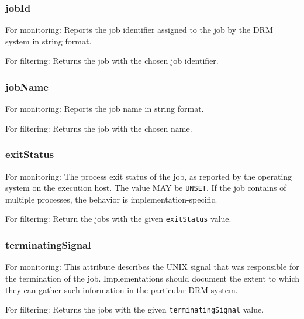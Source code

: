 \documentclass{article}
\newcommand{\h}[1]{\lstinline|#1|}
\newcommand{\rat}[1]{}
\begin{document}
\subsubsection{jobId}

For monitoring: Reports the job identifier assigned to the job by the DRM system in string format.

For filtering: Returns the job with the chosen job identifier.

\subsubsection{jobName}

For monitoring: Reports the job name in string format.

For filtering: Returns the job with the chosen name.

\subsubsection{exitStatus}

For monitoring: The process exit status of the job, as reported by the operating system on the execution host. The value MAY be \h{UNSET}. If the job contains of multiple processes, the behavior is implementation-specific.

For filtering: Return the jobs with the given \h{exitStatus} value.

\rat{Jobs without exit status information should be filtered out by asking for the appropriate states.}

\rat{June 29th 2011 conf call decided to explicitly decline any relationship between job status and exit code, since there is no common behavior in DRM systems. For this reason, exit status is allowed to be UNSET, without giving any further reasons. It is, however, expected that many implementations will put this on UNSET in the non-terminal job states.
}

\subsubsection{terminatingSignal}

For monitoring: This attribute describes the UNIX signal that was responsible for the termination of the job. Implementations should document the extent to which they can gather such information in the particular DRM system.

For filtering: Returns the jobs with the given \h{terminatingSignal} value.
\end{document}

